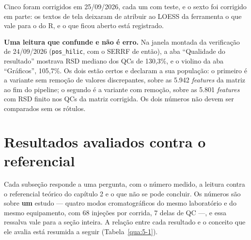 Cinco foram corrigidos em 25/09/2026, cada um com teste, e o sexto foi corrigido em parte: os textos de tela deixaram de atribuir ao LOESS da ferramenta o que vale para o do R, e o que ficou aberto está registrado.


\textbf{Uma leitura que confunde e não é erro.} Na janela montada da verificação de 24/09/2026 (\texttt{pos\_\allowbreak{}hilic}, com o SERRF de então), a aba ``Qualidade do resultado'' mostrava RSD mediano dos QCs de 130,3\%, e o violino da aba ``Gráficos'', 105,7\%. Os dois estão certos e declaram a sua população: o primeiro é a variante sem remoção de valores discrepantes, sobre as 5.942 \textit{features} da matriz ao fim do pipeline; o segundo é a variante com remoção, sobre as 5.801 \textit{features} com RSD finito nos QCs da matriz corrigida. Os dois números não devem ser comparados sem os rótulos.

\section{Resultados avaliados contra o referencial}\label{sec:5-3}

Cada subseção responde a uma pergunta, com o número medido, a leitura contra o referencial teórico do capítulo 2 e o que não se pode concluir. Os números são sobre \textbf{um} estudo --- quatro modos cromatográficos do mesmo laboratório e do mesmo equipamento, com 68 injeções por corrida, 7 delas de QC ---, e essa ressalva vale para a seção inteira. A relação entre cada resultado e o conceito que ele avalia está resumida a seguir (Tabela~\ref{qua:5-1}).

